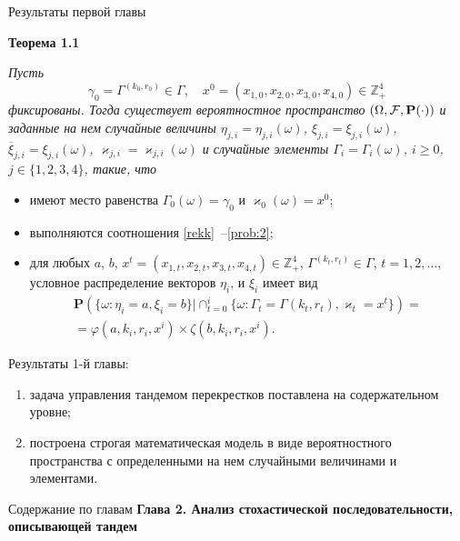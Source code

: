 \documentclass[10pt]{beamer}
\begin{document}
\begin{frame}[allowframebreaks]{Результаты первой главы}

    {\bf Теорема 1.1} {\it 
    Пусть 
    $$\gamma_0=\Gamma^{(k_0,r_0)} \in \Gamma, \quad x^0=(x_{1,0},x_{2,0}, x_{3,0},x_{4,0})\in \mathbb{Z}_+^4$$ фиксированы. Тогда существует вероятностное пространство $(\Omega, {\cal F}, {\mathbf P}(\cdot))$ и заданные на нем случайные величины $\eta_{j,i}=\eta_{j,i}(\omega)$, $\xi_{j,i}=\xi_{j,i}(\omega)$, $\overline{\xi}_{j,i}=\xi_{j,i}(\omega)$, $\varkappa_{j,i}=\varkappa_{j,i}(\omega)$ и случайные элементы $\Gamma_i=\Gamma_i(\omega)$, $i\geqslant 0$, $j\in \{1, 2, 3, 4\}$, такие, что 
    \begin{itemize}
    \item имеют место равенства $\Gamma_0(\omega) = \gamma_0$ и $\varkappa_0(\omega)=x^0$;
    \item выполняются соотношения \eqref{rekk}~--\eqref{prob:2};
    \item для любых  $a$, $b$, $x^t=(x_{1,t},x_{2,t},x_{3,t},x_{4,t}) \in \mathbb{Z}_+^4$, $\Gamma^{(k_t,r_t)} \in \Gamma$, $t = 1, 2, \ldots$, условное распределение векторов $\eta_i$, и $\xi_i$ имеет вид 
\begin{multline*}
    {\mathbf P}(\{ \omega \colon \eta_i = a, \xi_i=b\} |\cap_{t=0}^{i}\{\omega\colon \Gamma_t=\Gamma{(k_t,r_t)}, \varkappa_t=x^t\})=\\
=\varphi(a,k_i,r_i,x^i)\times \zeta(b,k_i,r_i,x^i).
\end{multline*}
    \end{itemize}
}

\framebreak

Результаты 1-й главы:
\begin{enumerate}
    \item задача управления тандемом перекрестков поставлена на содержательном уровне;
    \item построена строгая математическая модель в виде вероятностного пространства с определенными на нем случайными величинами и элементами.

\end{enumerate}


\end{frame}



  \begin{frame}{Содержание по главам}
  \Large{\textbf{Глава 2. Анализ стохастической последовательности, описывающей тандем}}\par


      \end{frame}
\end{document}
